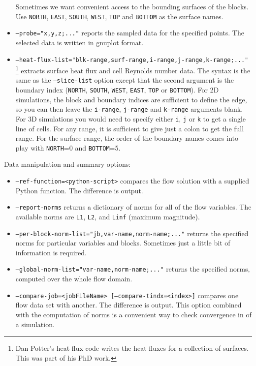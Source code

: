 \begin{itemize}
     Sometimes we want convenient access to the bounding surfaces of the blocks.
     Use \texttt{NORTH}, \texttt{EAST}, \texttt{SOUTH}, \texttt{WEST}, \texttt{TOP} and \texttt{BOTTOM} 
     as the surface names.
  \item \texttt{--probe="x,y,z;..."} reports the sampled data for the specified points.
     The selected data is written in gnuplot format.
  \item \texttt{--heat-flux-list="blk-range,surf-range,i-range,j-range,k-range;..."}\,\footnote{Dan Potter's heat flux code writes
     the heat fluxes for a collection of surfaces.  This was part of his PhD work.} extracts surface heat flux and cell Reynolds number data.
     The syntax is the same as the \texttt{--slice-list} option except that the second argument is the boundary index 
     (\texttt{NORTH}, \texttt{SOUTH}, \texttt{WEST}, \texttt{EAST}, \texttt{TOP} or \texttt{BOTTOM}).
     For 2D simulations, the block and boundary indices are sufficient to define the edge, 
     so you can then leave the \texttt{i-range}, \texttt{j-range} and \texttt{k-range} arguments blank.
     For 3D simulations you would need to specify either \texttt{i}, \texttt{j} or \texttt{k} to get a single line of cells.
     For any range, it is sufficient to give just a colon to get the full range.
     For the surface range, the order of the boundary names comes into play with \texttt{NORTH}=0 and \texttt{BOTTOM}=5.
\end{itemize}
Data manipulation and summary options:
\begin{itemize}
  \item \texttt{--ref-function=<python-script>} compares the flow solution with a supplied Python function.
     The difference is output.
  \item \texttt{--report-norms} returns a dictionary of norms for all of the flow variables.
    The available norms are \texttt{L1}, \texttt{L2}, and \texttt{Linf} (maximum magnitude).
  \item \texttt{--per-block-norm-list="jb,var-name,norm-name;..."} returns the specified norms 
     for particular variables and blocks.  Sometimes just a little bit of information is required.
  \item \texttt{--global-norm-list="var-name,norm-name;..."} returns the specified norms,
     computed over the whole flow domain.
  \item \texttt{--compare-job=<jobFileName> [--compare-tindx=<index>]} compares one flow data set with another.
     The difference is output.  This option combined with the computation of norms is a convenient way to check
     convergence in of a simulation.
\end{itemize}
